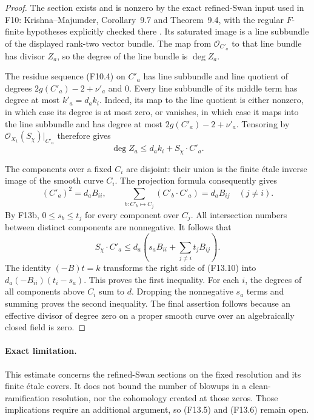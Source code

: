 \begin{proof}
The section exists and is nonzero by the exact refined-Swan
input used in F10: Krishna--Majumder, Corollary~9.7 and
Theorem~9.4, with the regular $F$-finite hypotheses explicitly
checked there \cite{KrishnaMajumder2026}. Its saturated image
is a line subbundle of the displayed rank-two vector bundle.
The map from $\mathcal O_{C'_a}$ to that line bundle has divisor
$Z_a$, so the degree of the line bundle is $\deg Z_a$.

The residue sequence (F10.4) on $C'_a$ has line subbundle and
line quotient of degrees $2g(C'_a)-2+\nu'_a$ and $0$.
Every line subbundle of its middle term has degree at most
$k'_a=d_a k_i$. Indeed, its map to the line quotient is either
nonzero, in which case its degree is at most zero, or vanishes,
in which case it maps into the line subbundle and has degree at
most $2g(C'_a)-2+\nu'_a$. Tensoring by
$\mathcal O_{X_1}(S_\chi)|_{C'_a}$ therefore gives
\[
                 \deg Z_a\leq d_a k_i+S_\chi\cdot C'_a.
 \tag{F13.10}
\]

The components over a fixed $C_i$ are disjoint: their union is
the finite \'etale inverse image of the smooth curve $C_i$.
The projection formula consequently gives
\[
 (C'_a)^2=d_aB_{ii},\qquad
 \sum_{b:C'_b\mapsto C_j}(C'_b\cdot C'_a)=d_aB_{ij}
                     \quad(j\ne i).
\]
By F13b, $0\leq s_b\leq t_j$ for every component over $C_j$.
All intersection numbers between distinct components are
nonnegative. It follows that
\[
 S_\chi\cdot C'_a
 \leq d_a\left(s_aB_{ii}+\sum_{j\ne i}t_jB_{ij}\right).
\]
The identity $(-B)t=k$ transforms the right side of (F13.10)
into $d_a(-B_{ii})(t_i-s_a)$. This proves the first inequality.
For each $i$, the degrees of all components above $C_i$ sum to
$d$. Dropping the nonnegative $s_a$ terms and summing proves
the second inequality. The final assertion follows because an
effective divisor of degree zero on a proper smooth curve over
an algebraically closed field is zero.
\end{proof}

\paragraph{Exact limitation.}
This estimate concerns the refined-Swan sections on the fixed
resolution and its finite \'etale covers. It does not bound the
number of blowups in a clean-ramification resolution, nor the
cohomology created at those zeros. Those implications require
an additional argument, so (F13.5) and (F13.6) remain open.
